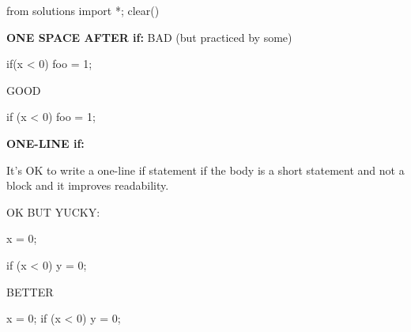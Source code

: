 \begin{python0}
from solutions import *; clear()
\end{python0}

\textbf{ONE SPACE AFTER if:}
BAD (but practiced by some)
\begin{console}
if(x < 0)
     foo = 1;  
\end{console}

GOOD
\begin{console}
if (x < 0)
   foo = 1;  
\end{console}

\textbf{ONE-LINE if:}

It's OK to write a one-line if statement if the body is
a short statement and not a block and it improves readability.

OK BUT YUCKY:
\begin{console}
x = 0;

if (x < 0)
    y = 0; 
\end{console}

BETTER
\begin{console}
x = 0;
if (x < 0) y = 0; 
\end{console}

